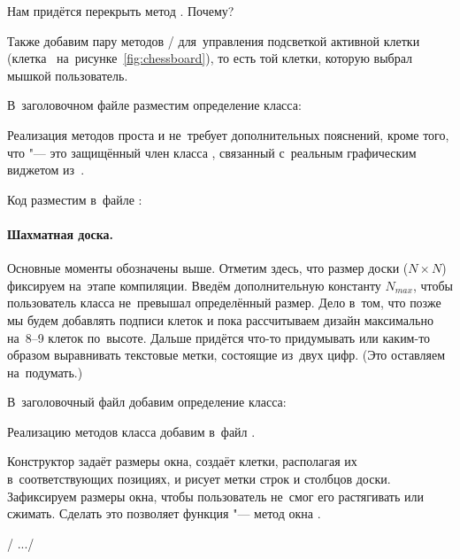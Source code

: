Нам придётся перекрыть метод . Почему?

Также добавим пару методов / для~управления подсветкой активной клетки (клетка~ на~рисунке~\ref{fig:chessboard}), то есть той клетки, которую выбрал мышкой пользователь.

В~заголовочном файле  разместим определение класса:


Реализация методов проста и не~требует дополнительных пояснений, кроме того, что  "--- это защищённый член класса , связанный с~реальным графическим виджетом из~.

Код разместим в~файле :




\paragraph{Шахматная доска.}
Основные моменты обозначены выше. Отметим здесь, что размер доски (\(N\times N\)) фиксируем на~этапе компиляции. Введём дополнительную константу \(N_{max}\), чтобы пользователь класса не~превышал определённый размер. Дело в~том, что позже мы будем добавлять подписи клеток и пока рассчитываем дизайн максимально на~8--9 клеток по~высоте. Дальше придётся что-то придумывать или каким-то образом выравнивать текстовые метки, состоящие из~двух цифр. (Это оставляем на~подумать.)

В~заголовочный файл  добавим определение класса:


Реализацию методов класса добавим в~файл .

Конструктор задаёт размеры окна, создаёт клетки, располагая их в~соответствующих позициях, и рисует метки строк и столбцов доски. Зафиксируем размеры окна, чтобы пользователь не~смог его растягивать или сжимать. Сделать это позволяет функция  "--- метод окна .

\cpp/  .../

